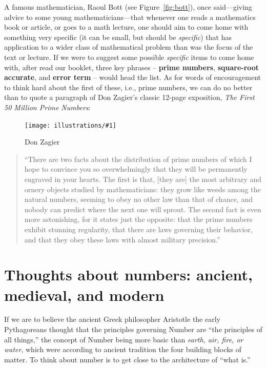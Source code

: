 \documentclass[11pt]{article}
\newcommand{\ill}[3]{ 
   \begin{figure}[H]
   \begin{center}
   \texttt{[image: illustrations/\#1]}
   \caption{#3}
   \end{center}
    \end{figure}
}
\theoremstyle{plain}
\theoremstyle{definition}
\numberwithin{equation}{section}
\numberwithin{figure}{section}
\numberwithin{table}{section}
\begin{document}
A famous mathematician, Raoul Bott (see Figure~\ref{fig:bott}), once
said---giving advice to some young mathematicians---that whenever one
reads a mathematics book or article, or goes to a math lecture, one
should aim to come home with something very specific (it can be small,
but should be {\em specific}) that has application to a wider class of
mathematical problem than was the focus of the text or lecture.  If we
were to suggest some possible {\em specific} items to come home with,
after read our booklet, three key phrases -- {\bf prime numbers}, {\bf
  square-root accurate}, and {\bf error term} -- would head the
list. As for words of encouragement to think hard about the first of
these, i.e., prime numbers, we can do no better than to quote a
paragraph of Don Zagier's classic 12-page exposition, {\em The First
  50 Million Prime Numbers}:
    
\ill{zagier}{.25}{Don Zagier}
                   
                   
\begin{quote}                      
  ``There are two facts about the distribution of prime numbers of
  which I hope to convince you so overwhelmingly that they will be
  permanently engraved in your hearts. The first is that, [they are]
  the most arbitrary and ornery objects studied by mathematicians:
  they grow like weeds among the natural numbers, seeming to obey no
  other law than that of chance, and nobody can predict where the next
  one will sprout. The second fact is even more astonishing, for it
  states just the opposite: that the prime numbers exhibit stunning
  regularity, that there are laws governing their behavior, and that
  they obey these laws with almost military precision.''
\end{quote}



\section{Thoughts about numbers: ancient, medieval, and modern}

If we are to believe the ancient Greek philosopher Aristotle the early
Pythagoreans thought that the principles governing Number are ``the
principles of all things,'' the concept of Number being more basic than
{\em earth, air, fire, or water}, which were according to ancient tradition
the four building blocks of matter. To think about number is to get
close to the architecture of ``what is.''
\end{document}
